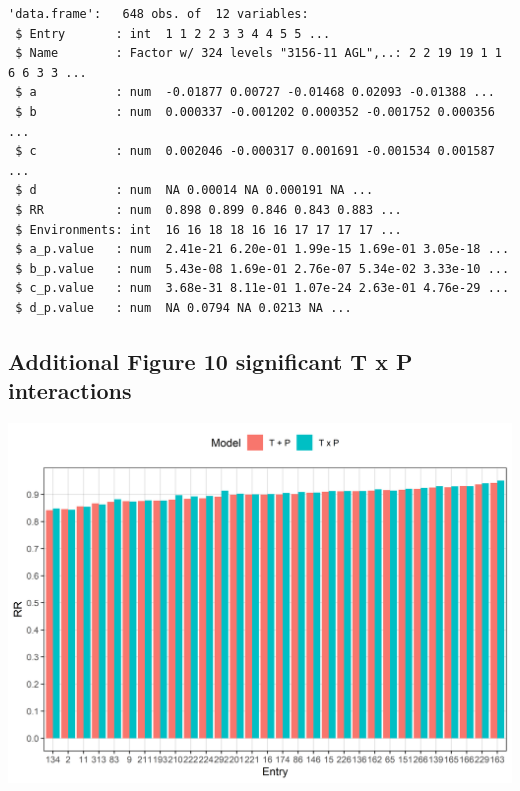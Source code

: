\documentclass[
]{article}
\begin{document}
\begin{verbatim}
'data.frame':   648 obs. of  12 variables:
 $ Entry       : int  1 1 2 2 3 3 4 4 5 5 ...
 $ Name        : Factor w/ 324 levels "3156-11 AGL",..: 2 2 19 19 1 1 6 6 3 3 ...
 $ a           : num  -0.01877 0.00727 -0.01468 0.02093 -0.01388 ...
 $ b           : num  0.000337 -0.001202 0.000352 -0.001752 0.000356 ...
 $ c           : num  0.002046 -0.000317 0.001691 -0.001534 0.001587 ...
 $ d           : num  NA 0.00014 NA 0.000191 NA ...
 $ RR          : num  0.898 0.899 0.846 0.843 0.883 ...
 $ Environments: int  16 16 18 18 16 16 17 17 17 17 ...
 $ a_p.value   : num  2.41e-21 6.20e-01 1.99e-15 1.69e-01 3.05e-18 ...
 $ b_p.value   : num  5.43e-08 1.69e-01 2.76e-07 5.34e-02 3.33e-10 ...
 $ c_p.value   : num  3.68e-31 8.11e-01 1.07e-24 2.63e-01 4.76e-29 ...
 $ d_p.value   : num  NA 0.0794 NA 0.0213 NA ...
\end{verbatim}

\hypertarget{additional-figure-10-significant-t-x-p-interactions}{%
\subsection{Additional Figure 10 significant T x P
interactions}\label{additional-figure-10-significant-t-x-p-interactions}}

\includegraphics{Additional/Additional_Figure_10.png}
\end{document}
